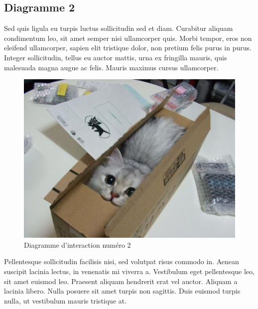 	\subsection{Diagramme 2}
	Sed quis ligula eu turpis luctus sollicitudin sed et diam. Curabitur aliquam condimentum leo, sit amet semper nisi ullamcorper quis. Morbi tempor, eros non eleifend ullamcorper, sapien elit tristique dolor, non pretium felis purus in purus. Integer sollicitudin, tellus eu auctor mattis, urna ex fringilla mauris, quis malesuada magna augue ac felis. Mauris maximus cursus ullamcorper.

		\begin{figure}
			\begin{center}
				\includegraphics[width=1\textwidth]{figure/interec2.jpg}
			\end{center}
			\caption{Diagramme d'interaction numéro 2}
			\label{fig:use1}
		\end{figure}


	 Pellentesque sollicitudin facilisis nisi, sed volutpat risus commodo in. Aenean suscipit lacinia lectus, in venenatis mi viverra a. Vestibulum eget pellentesque leo, sit amet euismod leo. Praesent aliquam hendrerit erat vel auctor. Aliquam a lacinia libero. Nulla posuere sit amet turpis non sagittis. Duis euismod turpis nulla, ut vestibulum mauris tristique at. 